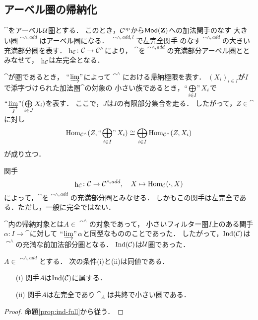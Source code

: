\setcounter{subsection}{2}
\subsection[アーベル圏の帰納化]{アーベル圏の帰納化}

$\cat$をアーベル$\mathcal{U}$圏とする．
このとき，$\mathcal{C}^{\rm op}$から$\mathop{\textsf{Mod}}\nolimits(\mathbf{Z})$への加法関手のなす
大きい圏$\cat^{\wedge,add}$はアーベル圏になる．
$\cat^{\wedge,add,l}$で左完全関手
のなす$\cat^{\wedge,add}$の大きい充満部分圏を表す．
$\mathop{\mathrm{h}}\nolimits_{\mathcal{C}}\colon\mathcal{C}\to\mathcal{C}^\wedge$により，
$\cat$を$\cat^{\wedge,add}$の充満部分アーベル圏ととみなせて，
$\mathop{\mathrm{h}}\nolimits_{\mathcal{C}}$は左完全となる．

\begin{Notation}
    $\cat$が圏であるとき，
    $\mathop{\text{``}\hspace{-0.7pt}\varinjlim\hspace{-1.5pt}\text{''}}$によって$\cat^\wedge$における帰納極限を表す．
    $(X_i)_{i\in I}$が$I$で添字づけられた加法圏$\cat$の対象の
    小さい族であるとき，$\ind<\bigoplus_{i\in I}>X_i$で
    $\ind<\varinjlim_J>(\bigoplus\limits_{i\in J}X_i)$を表す．
    ここで，$J$は$I$の有限部分集合を走る．
    したがって，$Z\in\cat$に対し
    \begin{equation*}
        \Hom_{\cat^\wedge}(Z,\ind<\bigoplus_{i\in I}>X_i)
        \cong
        \bigoplus_{i\in I}\Hom_{\cat^\wedge}(Z,X_i)
    \end{equation*}
    が成り立つ．
\end{Notation}

関手
\begin{equation*}
    \mathop{\mathrm{h}}\nolimits_{\mathcal{C}}\colon\mathcal{C}\to\mathcal{C}^{\wedge,add},\quad X\mapsto\mathop{\mathrm{Hom}}\nolimits_{\mathcal{C}}(\boldsymbol{\cdot},X)
\end{equation*}
によって，$\cat$を$\cat^{\wedge,add}$の充満部分圏とみなせる．
しかもこの関手は左完全である．ただし，一般に完全ではない．

$\cat$内の帰納対象とは$A\in\cat^\wedge$の対象であって，
小さいフィルター圏$I$上のある関手$\alpha\colon I\to\cat$に対して
$\mathop{\text{``}\hspace{-0.7pt}\varinjlim\hspace{-1.5pt}\text{''}}\alpha$と同型なもののことであった．
したがって，$\mathop{\mathrm{Ind}}(\mathcal{C})$は$\cat^\wedge$の充満な前加法部分圏となる．
$\mathop{\mathrm{Ind}}(\mathcal{C})$は$\mathcal{U}$圏であった．

\begin{Proposition}
    $A\in\cat^{\wedge,add}$とする．
    次の条件(i)と(ii)は同値である．
    \begin{enumerate}
        \item [(i)]関手$A$は$\mathop{\mathrm{Ind}}(\mathcal{C})$に属する．
        \item [(ii)]関手$A$は左完全であり$\cat_A$は共終で小さい圏である．
    \end{enumerate}
\end{Proposition}
\begin{proof}
    命題\ref{prop:ind-full}から従う．
\end{proof}

